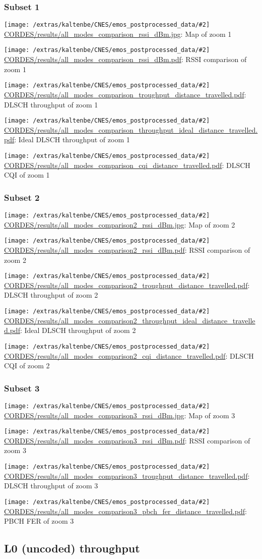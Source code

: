 \documentclass[a4paper,10pt]{article}
\newcommand{\printfile}[2][]{
 \begin{minipage}{8cm}
  \centering
  \texttt{[image: /extras/kaltenbe/CNES/emos\_postprocessed\_data/\#2]}
  \url{#2}: #1

 \end{minipage}
}
\begin{document}
\subsubsection*{Subset 1}

\printfile[Map of zoom 1]{CORDES/results/all_modes_comparison_rssi_dBm.jpg}
\printfile[RSSI comparison of zoom 1]{CORDES/results/all_modes_comparison_rssi_dBm.pdf}

\printfile[DLSCH throughput of zoom 1]{CORDES/results/all_modes_comparison_troughput_distance_travelled.pdf}
\printfile[Ideal DLSCH throughput of zoom 1]{CORDES/results/all_modes_comparison_throughput_ideal_distance_travelled.pdf}

\printfile[DLSCH CQI of zoom 1]{CORDES/results/all_modes_comparison_cqi_distance_travelled.pdf}

\subsubsection*{Subset 2}

\printfile[Map of zoom 2]{CORDES/results/all_modes_comparison2_rssi_dBm.jpg}
\printfile[RSSI comparison of zoom 2]{CORDES/results/all_modes_comparison2_rssi_dBm.pdf}

\printfile[DLSCH throughput of zoom 2]{CORDES/results/all_modes_comparison2_troughput_distance_travelled.pdf}
\printfile[Ideal DLSCH throughput of zoom 2]{CORDES/results/all_modes_comparison2_throughput_ideal_distance_travelled.pdf}

\printfile[DLSCH CQI of zoom 2]{CORDES/results/all_modes_comparison2_cqi_distance_travelled.pdf}

\subsubsection*{Subset 3}

\printfile[Map of zoom 3]{CORDES/results/all_modes_comparison3_rssi_dBm.jpg}
\printfile[RSSI comparison of zoom 3]{CORDES/results/all_modes_comparison3_rssi_dBm.pdf}

\printfile[DLSCH throughput of zoom 3]{CORDES/results/all_modes_comparison3_troughput_distance_travelled.pdf}
\printfile[PBCH FER of zoom 3]{CORDES/results/all_modes_comparison3_pbch_fer_distance_travelled.pdf}

\subsection{L0 (uncoded) throughput}
\end{document}
